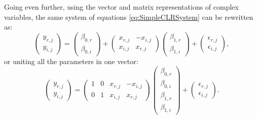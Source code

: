 \documentclass[
]{book}
\begin{document}
Going even further, using the vector and matrix representations of complex variables, the same system of equations \eqref{eq:SimpleCLRSystem} can be rewritten as:
\begin{equation}
    \begin{pmatrix} y_{r,j} \\ y_{i,j} \end{pmatrix} = \begin{pmatrix} \beta_{0,r} \\ \beta_{0,i} \end{pmatrix} + \begin{pmatrix} x_{r,j} & -x_{i,j} \\ x_{i,j} & x_{r,j} \end{pmatrix} \begin{pmatrix} \beta_{1,r} \\ \beta_{1,i} \end{pmatrix} + \begin{pmatrix} \epsilon_{r,j} \\ \epsilon_{i,j} \end{pmatrix} ,
    \label{eq:SimpleCLRSystemVector01}
\end{equation}
or uniting all the parameters in one vector:
\begin{equation}
    \begin{pmatrix} y_{r,j} \\ y_{i,j} \end{pmatrix} = \begin{pmatrix} 1 & 0 & x_{r,j} & -x_{i,j} \\ 0 & 1 & x_{i,j} & x_{r,j} \end{pmatrix} \begin{pmatrix} \beta_{0,r} \\ \beta_{0,i} \\ \beta_{1,r} \\ \beta_{1,i} \end{pmatrix} + \begin{pmatrix} \epsilon_{r,j} \\ \epsilon_{i,j} \end{pmatrix} .
    \label{eq:SimpleCLRSystemVector02}
\end{equation}
\end{document}
